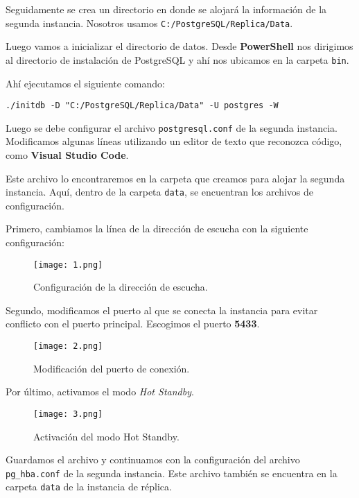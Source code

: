 \documentclass{article}
\begin{document}
Seguidamente se crea un directorio en donde se alojará la información de la segunda instancia. Nosotros usamos \texttt{C:/PostgreSQL/Replica/Data}.

Luego vamos a inicializar el directorio de datos. Desde \textbf{PowerShell} nos dirigimos al directorio de instalación de PostgreSQL y ahí nos ubicamos en la carpeta \texttt{bin}.

Ahí ejecutamos el siguiente comando:

\begin{verbatim}
./initdb -D "C:/PostgreSQL/Replica/Data" -U postgres -W
\end{verbatim}

Luego se debe configurar el archivo \texttt{postgresql.conf} de la segunda instancia. Modificamos algunas líneas utilizando un editor de texto que reconozca código, como \textbf{Visual Studio Code}.

Este archivo lo encontraremos en la carpeta que creamos para alojar la segunda instancia. Aquí, dentro de la carpeta \texttt{data}, se encuentran los archivos de configuración.

\newpage
Primero, cambiamos la línea de la dirección de escucha con la siguiente configuración:

\begin{figure}[h]
    \centering
    \texttt{[image: 1.png]}
    \caption{Configuración de la dirección de escucha.}
\end{figure}

Segundo, modificamos el puerto al que se conecta la instancia para evitar conflicto con el puerto principal. Escogimos el puerto \textbf{5433}.

\begin{figure}[h]
    \centering
    \texttt{[image: 2.png]}
    \caption{Modificación del puerto de conexión.}
\end{figure}

Por último, activamos el modo \textit{Hot Standby}.

\begin{figure}[h]
    \centering
    \texttt{[image: 3.png]}
    \caption{Activación del modo Hot Standby.}
\end{figure}

Guardamos el archivo y continuamos con la configuración del archivo \texttt{pg\_hba.conf} de la segunda instancia. Este archivo también se encuentra en la carpeta \texttt{data} de la instancia de réplica.
\end{document}
